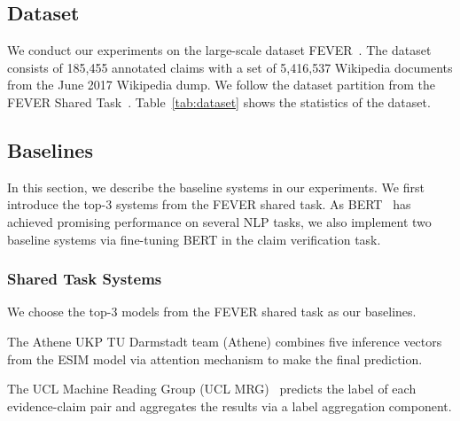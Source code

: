 \documentclass[11pt,a4paper]{article}
\begin{document}
\subsection{Dataset}
We conduct our experiments on the large-scale dataset FEVER~\cite{thorne2018fever}. The dataset consists of 185,455 annotated claims with a set of 5,416,537 Wikipedia documents from the June 2017 Wikipedia dump. We follow the dataset partition from the FEVER Shared Task~\cite{thorne18fact}. Table~\ref{tab:dataset} shows the statistics of the dataset.

\begin{table}[t!]
\begin{center}
\end{center}
\caption{\label{tab:dataset} Statistics of FEVER dataset.}
\end{table}


\subsection{Baselines}
In this section, we describe the baseline systems in our experiments. We first introduce the top-3 systems from the FEVER shared task.
As BERT~\cite{devlin2018bert} has achieved promising performance on several NLP tasks, we also implement two baseline systems via fine-tuning BERT in the claim verification task.

\subsubsection*{Shared Task Systems}
We choose the top-3 models from the FEVER shared task as our baselines. 

The Athene UKP TU Darmstadt team (Athene) \cite{hanselowski2018ukp} combines five inference vectors from the ESIM model via attention mechanism to make the final prediction. 

The UCL Machine Reading Group (UCL MRG)~\cite{yoneda2018ucl} predicts the label of each evidence-claim pair and aggregates the results via a label aggregation component. 
\end{document}
